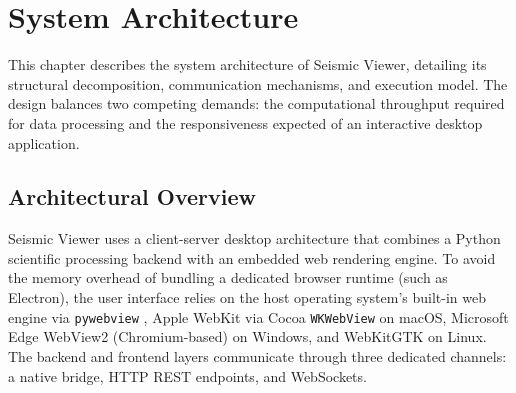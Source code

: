 
\chapter{System Architecture}
\label{ch:architecture}

This chapter describes the system architecture of Seismic Viewer, detailing its structural decomposition, communication mechanisms, and execution model. The design balances two competing demands: the computational throughput required for data processing and the responsiveness expected of an interactive desktop application.

\section{Architectural Overview}
\label{sec:arch-overview}

Seismic Viewer uses a client-server desktop architecture that combines a Python scientific processing backend with an embedded web rendering engine. To avoid the memory overhead of bundling a dedicated browser runtime (such as Electron), the user interface relies on the host operating system's built-in web engine via \texttt{pywebview} \cite{pywebview}, Apple WebKit via Cocoa \texttt{WKWebView} on macOS, Microsoft Edge WebView2 (Chromium-based) on Windows, and WebKitGTK on Linux. The backend and frontend layers communicate through three dedicated channels: a native bridge, HTTP REST endpoints, and WebSockets.

